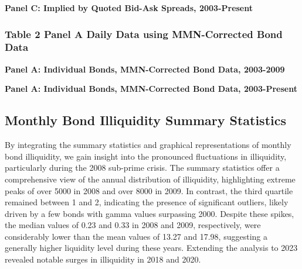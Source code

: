 \documentclass{article}
\newcommand*{\PathToOutput}{../output/}%
\begin{document}
\begin{table}[hbt!]
\centering
\textbf{\large Panel C: Implied by Quoted Bid-Ask Spreads, 2003-Present}
\resizebox{\textwidth}{!}{%
    
}
\label{table:table2_panelC_new}
\end{table}


\subsubsection{Table 2 Panel A Daily Data using MMN-Corrected Bond Data}


\begin{table}[hbt!]
\centering
\textbf{\large Panel A: Individual Bonds, MMN-Corrected Bond Data, 2003-2009}

\label{table:table2_panelA_daily_mmn_paper}
\end{table}


\begin{table}[hbt!]
\centering
\textbf{\large Panel A: Individual Bonds, MMN-Corrected Bond Data, 2003-Present}
\resizebox{\textwidth}{!}{%
    
}
\label{table:table2_panelA_daily_mmn_new}
\end{table}


\subsection{Monthly Bond Illiquidity Summary Statistics}

By integrating the summary statistics and graphical representations of monthly bond illiquidity, we gain insight into the pronounced fluctuations in illiquidity, particularly during the 2008 sub-prime crisis. The summary statistics offer a comprehensive view of the annual distribution of illiquidity, highlighting extreme peaks of over 5000 in 2008 and over 8000 in 2009. In contrast, the third quartile remained between 1 and 2, indicating the presence of significant outliers, likely driven by a few bonds with gamma values surpassing 2000. Despite these spikes, the median values of 0.23 and 0.33 in 2008 and 2009, respectively, were considerably lower than the mean values of 13.27 and 17.98, suggesting a generally higher liquidity level during these years. Extending the analysis to 2023 revealed notable surges in illiquidity in 2018 and 2020.
\end{document}
